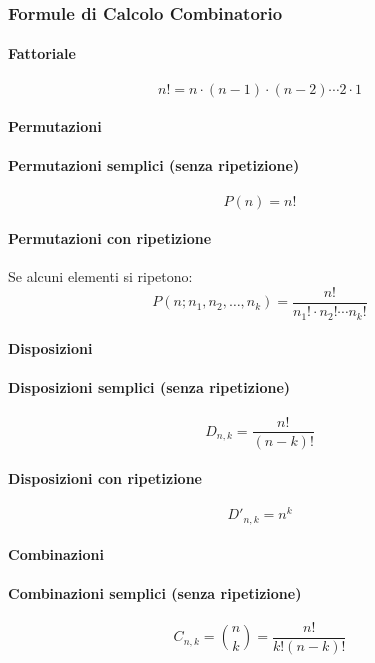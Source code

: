 \documentclass{article}
\begin{document}
\subsubsection{Formule di Calcolo Combinatorio}

\paragraph{Fattoriale}
\[
n! = n \cdot (n-1) \cdot (n-2) \cdots 2 \cdot 1
\]

\paragraph{Permutazioni}

\paragraph{Permutazioni semplici (senza ripetizione)}
\[
P(n) = n!
\]

\paragraph{Permutazioni con ripetizione}
Se alcuni elementi si ripetono:
\[
P(n; n_1, n_2, \ldots, n_k) = \frac{n!}{n_1! \cdot n_2! \cdots n_k!}
\]

\paragraph{Disposizioni}

\paragraph{Disposizioni semplici (senza ripetizione)}
\[
D_{n,k} = \frac{n!}{(n-k)!}
\]

\paragraph{Disposizioni con ripetizione}
\[
D'_{n,k} = n^k
\]

\paragraph{Combinazioni}

\paragraph{Combinazioni semplici (senza ripetizione)}
\[
C_{n,k} = \binom{n}{k} = \frac{n!}{k!(n-k)!}
\]
\end{document}
